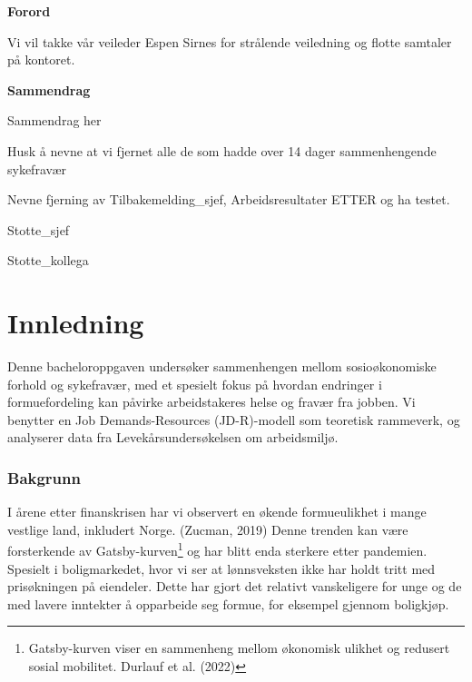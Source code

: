\documentclass[
  12pt,
  a4paper,
  DIV=11,
  numbers=noendperiod]{scrartcl}
\renewcommand*\contentsname{Table of contents}
\newcommand\contentsname{Table of contents}
\begin{document}




\thispagestyle{plain}
\begin{center}
    \Large
    \textbf{Forord}
\end{center}

Vi vil takke vår veileder Espen Sirnes for strålende veiledning og
flotte samtaler på kontoret.

\newpage
\hypersetup{linkcolor=black}
\renewcommand{\contentsname}{Innholdsfortegnelse}
\renewcommand*{\figureautorefname}{Figur}
\renewcommand*{\tableautorefname}{Tabell}
\renewcommand*{\equationautorefname}{Ligning:}
\tableofcontents
\listoffigures
\listoftables
\hypersetup{linkcolor=blue}
\newpage
\thispagestyle{plain}
\begin{center}
    \Large
    \textbf{Sammendrag}
\end{center}

Sammendrag her

Husk å nevne at vi fjernet alle de som hadde over 14 dager
sammenhengende sykefravær

Nevne fjerning av Tilbakemelding\_sjef, Arbeidsresultater ETTER og ha
testet.

Stotte\_sjef

Stotte\_kollega

\newpage

\section{Innledning}\label{innledning}

Denne bacheloroppgaven undersøker sammenhengen mellom sosioøkonomiske
forhold og sykefravær, med et spesielt fokus på hvordan endringer i
formuefordeling kan påvirke arbeidstakeres helse og fravær fra jobben.
Vi benytter en Job Demands-Resources (JD-R)-modell som teoretisk
rammeverk, og analyserer data fra Levekårsundersøkelsen om arbeidsmiljø.

\subsubsection{Bakgrunn}\label{bakgrunn}

I årene etter finanskrisen har vi observert en økende formueulikhet i
mange vestlige land, inkludert Norge. (Zucman, 2019) Denne trenden kan
være forsterkende av Gatsby-kurven\footnote{Gatsby-kurven viser en
  sammenheng mellom økonomisk ulikhet og redusert sosial mobilitet.
  Durlauf et al. (2022)} og har blitt enda sterkere etter pandemien.
Spesielt i boligmarkedet, hvor vi ser at lønnsveksten ikke har holdt
tritt med prisøkningen på eiendeler. Dette har gjort det relativt
vanskeligere for unge og de med lavere inntekter å opparbeide seg
formue, for eksempel gjennom boligkjøp.
\end{document}
